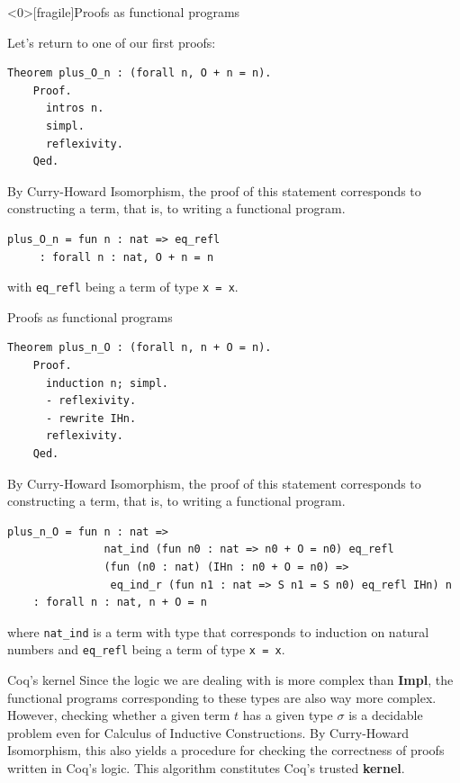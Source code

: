 \documentclass[10pt]{beamer}
\begin{document}
\begin{frame}<0>[fragile]{Proofs as functional programs}

  Let's return to one of our first proofs:

  \begin{lstlisting}[language=Coq]
    Theorem plus_O_n : (forall n, O + n = n).
    Proof.
      intros n.
      simpl.
      reflexivity.
    Qed.

  \end{lstlisting}

  By Curry-Howard Isomorphism, the proof of this statement corresponds to constructing a term, that is, to writing a functional program.

   \begin{lstlisting}[language=Coq]
    plus_O_n = fun n : nat => eq_refl
     : forall n : nat, O + n = n
  \end{lstlisting}

 with \texttt{eq\_refl} being a term of type \texttt{x = x}.
  
\end{frame}

\begin{frame}[fragile]{Proofs as functional programs}
  \begin{lstlisting}[language=Coq]
    Theorem plus_n_O : (forall n, n + O = n).
    Proof.
      induction n; simpl.
      - reflexivity.
      - rewrite IHn. 
      reflexivity.
    Qed.
  \end{lstlisting}
By Curry-Howard Isomorphism, the proof of this statement corresponds to constructing a term, that is, to writing a functional program.
  \begin{lstlisting}[language=Coq]
    plus_n_O = fun n : nat =>
               nat_ind (fun n0 : nat => n0 + O = n0) eq_refl
               (fun (n0 : nat) (IHn : n0 + O = n0) =>
                eq_ind_r (fun n1 : nat => S n1 = S n0) eq_refl IHn) n
    : forall n : nat, n + O = n
  \end{lstlisting}
  where \texttt{nat\_ind} is a term with type that corresponds to induction on natural numbers and \texttt{eq\_refl} being a term of type \texttt{x = x}.

\end{frame}
\begin{frame}{Coq's kernel}
  Since the logic we are dealing with is more complex than {\bf Impl}, the functional programs corresponding to these types are also way more complex. However, checking whether a given term $t$ has a given type $\sigma$ is a decidable problem even for Calculus of Inductive Constructions. By Curry-Howard Isomorphism, this also yields a procedure for checking the correctness of proofs written in Coq's logic.  This algorithm constitutes Coq's trusted {\bf kernel}.

\end{frame}
\end{document}
